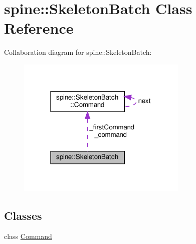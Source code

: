 \hypertarget{classspine_1_1SkeletonBatch}{}\section{spine\+:\+:Skeleton\+Batch Class Reference}
\label{classspine_1_1SkeletonBatch}


Collaboration diagram for spine\+:\+:Skeleton\+Batch\+:
\nopagebreak
\begin{figure}[H]
\begin{center}
\leavevmode
\includegraphics[width=230pt]{classspine_1_1SkeletonBatch__coll__graph}
\end{center}
\end{figure}
\subsection*{Classes}
\begin{DoxyCompactItemize}
\item 
class \hyperlink{classspine_1_1SkeletonBatch_1_1Command}{Command}
\end{DoxyCompactItemize}
